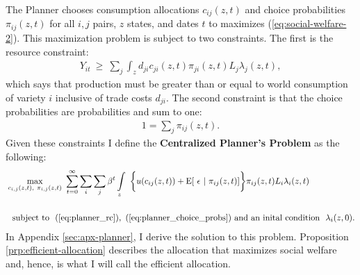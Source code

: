 \documentclass[12pt,pdftex]{article}
\begin{document}
\begin{onehalfspacing}
The Planner chooses consumption allocations $c_{ij}(z, t)$ and choice probabilities $\pi_{ij}(z,t)$ for all $i,j$ pairs, $z$ states, and dates $t$ to maximizes (\ref{eq:social-welfare-2}). This maximization problem is subject to two constraints. The first is the resource constraint:
\begin{align}
Y_{it} \  \geq \ \sum_{j} \int_{z} d_{ji} c_{ji}(z, t) \pi_{ji}(z,t) L_{j}\lambda_{j}(z, t), 
\label{eq:planner_rc}
\end{align}
which says that production must be greater than or equal to world consumption of variety $i$ inclusive of trade costs $d_{ji}$. The second constraint is that the choice probabilities are probabilities and sum to one:
\begin{align}
1 = \sum_{j}\pi_{ij}(z,t).
\label{eq:planner_choice_probs}
\end{align}
Given these constraints I define the \textbf{Centralized Planner's Problem} as the following:
\begin{align}
&\max\limits_{c_{i,j}(z, t),\ \pi_{i,j}(z, t)} \ \sum_{t=0}^{\infty}  \sum_{i} \sum_{j} \beta^{t} \int\limits_{z}   \  \bigg \{  u(c_{ij}(z, t) ) + \mathrm{E}[ \ \epsilon \ | \ \pi_{ij}(z,t) ] \bigg \}\pi_{ij}(z,t) L_{i} \lambda_{i}(z, t) \ \ \label{eq:planner_problem}\\
\nonumber \\
& \ \ \mbox{subject to} \ \ (\ref{eq:planner_rc}), \ (\ref{eq:planner_choice_probs}) \ \mbox{and an inital condition} \ \ \lambda_i(z, 0).
\end{align}
In Appendix \ref{sec:apx-planner}, I derive the solution to this problem. Proposition \ref{prp:efficient-allocation} describes the allocation that maximizes social welfare and, hence, is what I will call the efficient allocation.


\end{onehalfspacing}
\end{document}
